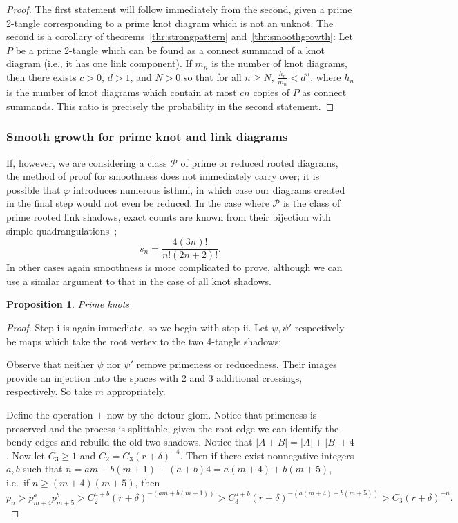 \documentclass[amsmath,longbibliography,secnumarabic,floatfix,amssymb,nofootinbib,nobibnotes,letterpaper,11pt,tightenlines,notitlepage,showkeys,showlabels]{amsart}%
\newcommand{\PrimeShad}{\mathscr{P}}
\newtheorem{proposition}[theorem]{Proposition}
\begin{document}
\begin{proof}
  The first statement will follow immediately from the second, given a
  prime 2-tangle corresponding to a prime knot diagram which is not an
  unknot. The second is a corollary of
  theorems~\ref{thr:strongpattern} and~\ref{thr:smoothgrowth}: Let $P$
  be a prime 2-tangle which can be found as a connect summand of a knot
  diagram (i.e., it has one link component). If $m_n$ is the number of
  knot diagrams, then there exists $c > 0$, $d > 1$, and $N > 0$ so
  that for all $n \ge N$, $\frac {h_n}{m_n} < d^n$, where $h_n$ is the
  number of knot diagrams which contain at most $cn$ copies of $P$ as
  connect summands. This ratio is precisely the probability in the
  second statement.
\end{proof}

\subsubsection{Smooth growth for prime knot and link diagrams}
\label{sec:smoothprime}

If, however, we are considering a class $\PrimeShad$ of prime or
reduced rooted diagrams, the method of proof for smoothness does not
immediately carry over; it is possible that $\varphi$ introduces
numerous isthmi, in which case our diagrams created in the final step
would not even be reduced. In the case where $\PrimeShad$ is the class
of prime rooted link shadows, exact counts are known from their
bijection with simple quadrangulations~\cite{AlbenqueSQT};
\[ s_n = \frac{4(3n)!}{n!(2n + 2)!}.\]
In other cases again smoothness is more complicated to prove, although we can use a similar argument
to that in the case of all knot shadows.

\begin{proposition}
  Prime knots
\end{proposition}

\begin{proof}
  Step i is again immediate, so we begin with step ii. Let $\psi, \psi'$ respectively be maps which
  take the root vertex to the two 4-tangle shadows:

  Observe that neither $\psi$ nor $\psi'$ remove primeness or reducedness. Their images provide an
  injection into the spaces with 2 and 3 additional crossings, respectively. So take $m$
  appropriately.

  Define the operation $+$ now by the detour-glom. Notice that primeness is preserved and the
  process is splittable; given the root edge we can identify the bendy edges and rebuild the old two
  shadows. Notice that $|A + B| = |A| + |B| + 4$. Now let $C_3 \ge 1$ and $C_2 = C_3(r +
  \delta)^{-4}$. Then if there exist nonnegative integers $a, b$ such that $n = am + b(m+1) + (a+b)4
  = a(m + 4) + b(m+5)$, i.e.\ if $n \ge (m+4)(m+5)$, then
  \[ p_n > p_{m+4}^ap_{m+5}^b > C_2^{a+b}(r+\delta)^{-(am+b(m+1))} > C_3^{a+b}(r+\delta)^{-(a(m+4) + b(m+5))}
  > C_3(r+\delta)^{-n}.\]
\end{proof}
\end{document}
